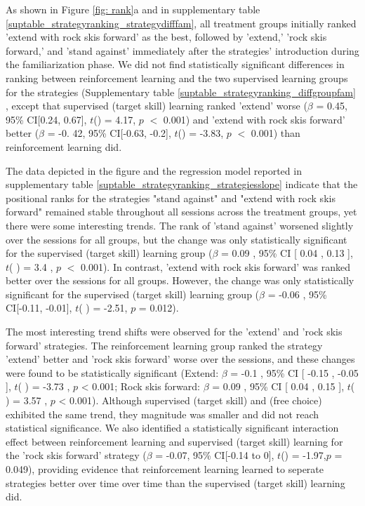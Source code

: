 \documentclass{article}
\begin{document}
As shown in Figure \ref{fig: rank}a and in supplementary table \ref{suptable_strategyranking_strategydifffam}, all treatment groups initially ranked 'extend with rock skis forward' as the best, followed by 'extend,' 'rock skis forward,' and 'stand against' immediately after the strategies' introduction during the familiarization phase. We did not find statistically significant differences in ranking between reinforcement learning and the two supervised learning groups for the strategies (Supplementary table \ref{suptable_strategyranking_diffgroupfam} , except that supervised (target skill) learning ranked 'extend' worse ($\beta$ = 0.45, 95\% CI[0.24,  0.67], $t$() = 4.17, $p$ $<$ 0.001) and 'extend with rock skis forward' better  ($\beta$ = -0. 42, 95\% CI[-0.63, -0.2], $t$() = -3.83, $p$ $<$ 0.001) than reinforcement learning did.

The data depicted in the figure and the regression model reported in supplementary table \ref{suptable_strategyranking_strategiesslope} indicate that the positional ranks for the strategies "stand against" and "extend with rock skis forward" remained stable throughout all sessions across the treatment groups, yet there were some interesting trends. The rank of 'stand against' worsened slightly over the sessions for all groups, but the change was only statistically significant for the supervised (target skill) learning group  ($\beta$ = 0.09 , 95\% CI [ 0.04 ,  0.13 ], $t$(  ) = 3.4 , $p$  $<$  0.001). In contrast, 'extend with rock skis forward' was ranked better over the sessions for all groups. However, the change was only statistically significant for the supervised (target skill) learning group ($\beta$ = -0.06 , 95\% CI[-0.11, -0.01], $t$( ) = -2.51, $p$ = 0.012). 

The most interesting trend shifts were observed for the 'extend' and 'rock skis forward' strategies. The reinforcement learning group ranked the strategy 'extend' better and 'rock skis forward' worse over the sessions, and these changes were found to be statistically significant (Extend: $\beta$ = -0.1 , 95\% CI [ -0.15 ,  -0.05 ], $t$(  ) = -3.73 , $p$  <  0.001; Rock skis forward:  $\beta$ = 0.09 , 95\% CI [ 0.04 ,  0.15 ], $t$(  ) = 3.57 , $p$  <  0.001). Although supervised (target skill) and (free choice) exhibited the same trend, they magnitude was smaller and did not reach statistical significance. 
We also identified a statistically significant interaction effect between reinforcement learning and supervised (target skill) learning for the 'rock skis forward' strategy ($\beta$ = -0.07, 95\% CI[-0.14 to 0], $t$() = -1.97,$p$ = 0.049), providing evidence that reinforcement learning learned to seperate strategies better over time over time than the supervised (target skill) learning did. 
\end{document}
